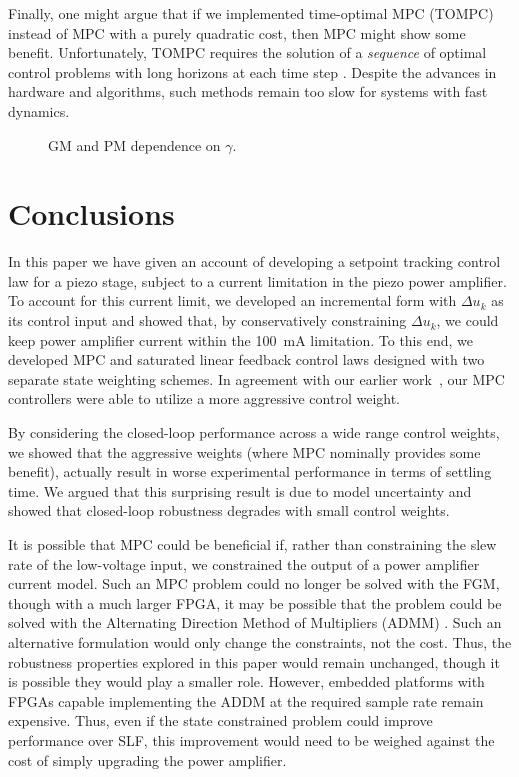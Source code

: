\documentclass[twocolumn,twoside]{IEEEtran}
\begin{document}
Finally, one might argue that if we implemented time-optimal MPC (TOMPC) \cite{broeck_time_2009} instead of MPC with a purely quadratic cost, then MPC might show some benefit. Unfortunately, TOMPC requires the solution of a \emph{sequence} of optimal control problems with long horizons at each time step \cite{broeck_time_2009}. Despite the advances in hardware and algorithms, such methods remain too slow for systems with fast dynamics. 

\begin{figure}[ht!]
  
  \caption{GM and PM dependence on $\gamma$.}
  \label{fig:gmpm}
\end{figure}

\section{Conclusions}
In this paper we have given an account of developing a setpoint tracking control law for a piezo stage, subject to a current limitation in the piezo power amplifier. To account for this current limit, we developed an incremental form with $\Delta u_k$ as its control input and showed that, by conservatively constraining $\Delta u_k$, we could keep power amplifier current within the 100~mA limitation. To this end, we developed MPC and saturated linear feedback control laws designed with two separate state weighting schemes. In agreement with our earlier work~\cite{braker_application_2017}, our MPC controllers were able to utilize a more aggressive control weight.

By considering the closed-loop performance across a wide range control weights, we showed that the aggressive weights (where MPC nominally provides some benefit), actually result in worse experimental performance in terms of settling time. We argued that this surprising result is due to model uncertainty and showed that closed-loop robustness degrades with small control weights. 

It is possible that MPC could be beneficial if, rather than constraining the slew rate of the low-voltage input, we constrained the output of a power amplifier current model. Such an MPC problem could no longer be solved with the FGM, though with a much larger FPGA, it may be possible that the problem could be solved with the Alternating Direction Method of Multipliers (ADMM) \cite{Jerez_Trans_2014}. Such an alternative formulation would only change the constraints, not the cost. Thus, the robustness properties explored in this paper would remain unchanged, though it is possible they would play a smaller role. However, embedded platforms with FPGAs capable implementing the ADDM at the required sample rate remain expensive. Thus, even if the state constrained problem could improve performance over SLF, this improvement would need to be weighed against the cost of simply upgrading the power amplifier. 
\end{document}
